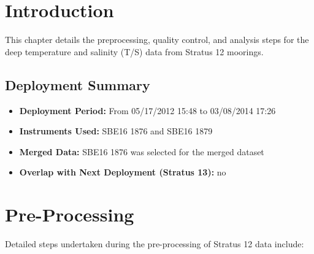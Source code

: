 
\newcommand{\projectname}{stratus}
\newcommand{\displayprojectname}{Stratus}
\newcommand{\caseyear}{2012}
\newcommand{\casenumber}{12}
\newcommand{\nextcasenumber}{13}
\newcommand{\FirstInstrumentType}{SBE16}
\newcommand{\SecondInstrumentType}{SBE16}
\newcommand{\DeploymentSpike}{05/17/2012 15:48}
\newcommand{\DeploymentRecordedSpike}{05/17/2012 15:48}
\newcommand{\RecoverySpike}{03/08/2014 17:26}
\newcommand{\RecoveryRecordedSpike}{03/08/2014 17:26}
\newcommand{\FirstInstrument}{1876}
\newcommand{\SecondInstrument}{1879}
\newcommand{\CurrentDeploymentInstrument}{\FirstInstrumentType{} \FirstInstrument}
\newcommand{\pressureavailable}{no}
\newcommand{\pressurenote}{ The pressure data is not available for this deployment, so the pressure variable is not shown in this figure.}
\newcommand{\WindowSize}{12}
\newcommand{\ThresholdValue}{3}
\newcommand{\HasNextDeploymentOverlap}{no}

\section{Introduction}
This chapter details the preprocessing, quality control, 
and analysis steps for the deep temperature and salinity (T/S) data from \displayprojectname{} \casenumber{} moorings.

\subsection{Deployment Summary}
\begin{itemize}
    \item \textbf{Deployment Period:} From \DeploymentSpike{} to \RecoverySpike{}
    \item \textbf{Instruments Used:} \FirstInstrumentType{} \FirstInstrument{} and \SecondInstrumentType{} \SecondInstrument{}
    \item \textbf{Merged Data:} \CurrentDeploymentInstrument{} was selected for the merged dataset
    \item \textbf{Overlap with Next Deployment (\displayprojectname{} \nextcasenumber{}):} \HasNextDeploymentOverlap{}
\end{itemize}

\section{Pre-Processing}
Detailed steps undertaken during the pre-processing of \displayprojectname{} \casenumber{} data include:

